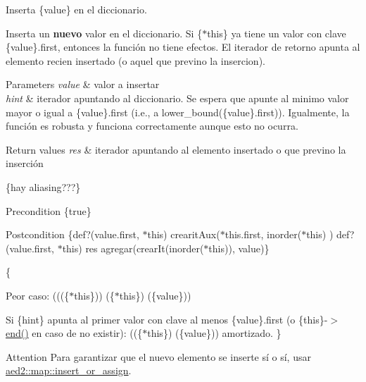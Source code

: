 Inserta \{value\} en el diccionario. 

Inserta un {\bfseries nuevo} valor en el diccionario. Si \{$\ast$this\} ya tiene un valor con clave \{value\}.first, entonces la función no tiene efectos. El iterador de retorno apunta al elemento recien insertado (o aquel que previno la insercion).


\begin{DoxyParams}{Parameters}
{\em value} & valor a insertar \\
\hline
{\em hint} & iterador apuntando al diccionario. Se espera que apunte al minimo valor mayor o igual a \{value\}.first (i.\+e., a lower\+\_\+bound(\{value\}.first)). Igualmente, la función es robusta y funciona correctamente aunque esto no ocurra. \\
\hline
\end{DoxyParams}

\begin{DoxyRetVals}{Return values}
{\em res} & iterador apuntando al elemento insertado o que previno la inserción\\
\hline
\end{DoxyRetVals}
\{hay aliasing???\}

\begin{DoxyPrecond}{Precondition}
\{true\} 
\end{DoxyPrecond}
\begin{DoxyPostcond}{Postcondition}
\{def?(value.\+first, $\ast$this)  crearit\+Aux($\ast$this.first, inorder($\ast$this) )   def?(value.\+first, $\ast$this)  res  agregar(crear\+It(inorder($\ast$this)), value)\}
\end{DoxyPostcond}
\{
\begin{DoxyItemize}
\item Peor caso\+: (((\{$\ast$this\}))  (\{$\ast$this\})  (\{value\}))
\item Si \{hint\} apunta al primer valor con clave al menos \{value\}.first (o \{this\}-\/$>$\hyperlink{classaed2_1_1iterator_a67caf9468be999e9be96b7add5d79946}{end()} en caso de no existir)\+: ((\{$\ast$this\})  (\{value\})) amortizado. \}
\end{DoxyItemize}

\begin{DoxyAttention}{Attention}
Para garantizar que el nuevo elemento se inserte sí o sí, usar \hyperlink{classaed2_1_1map_a2ef6723c183916276b0afc4a4c721475}{aed2\+::map\+::insert\+\_\+or\+\_\+assign}. 
\end{DoxyAttention}
\mbox{\label{classaed2_1_1iterator_aa1870e8bfa4f45c82fa1ee076846922b}} 
